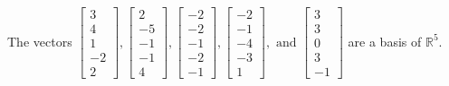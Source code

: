 \begin{exercise}
\begin{exerciseStatement}
  \end{exerciseStatement}
  \begin{exerciseAnswer}
   The vectors \(\left[\begin{array}{r}
3 \\
4 \\
1 \\
-2 \\
2
\end{array}\right] , \left[\begin{array}{r}
2 \\
-5 \\
-1 \\
-1 \\
4
\end{array}\right] , \left[\begin{array}{r}
-2 \\
-2 \\
-1 \\
-2 \\
-1
\end{array}\right] , \left[\begin{array}{r}
-2 \\
-1 \\
-4 \\
-3 \\
1
\end{array}\right] , \text{ and } \left[\begin{array}{r}
3 \\
3 \\
0 \\
3 \\
-1
\end{array}\right]\) 
  	 are  a basis of \(\mathbb{R}^5\).
  


  \end{exerciseAnswer}
\end{exercise}